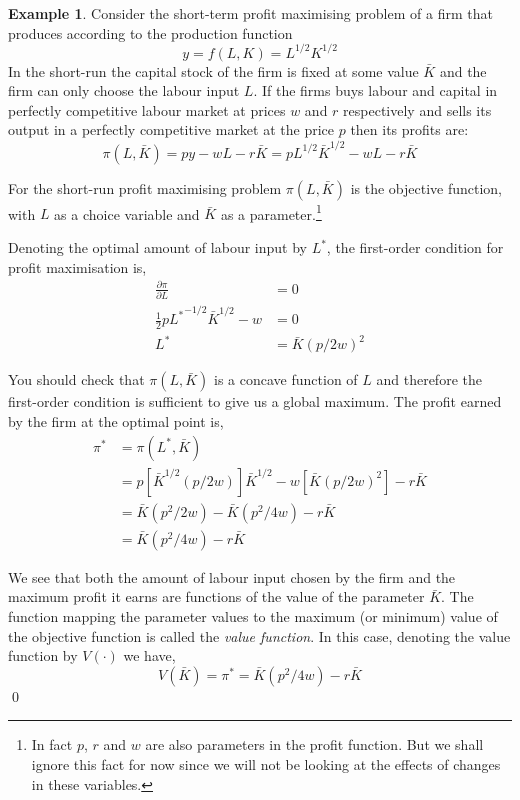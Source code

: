 \documentclass[12pt,reqno,openany]{amsbook}
\theoremstyle{plain}
\theoremstyle{definition}
\newtheorem{exmp}{Example}[chapter]
\begin{document}
\begin{exmp}\label{exmp:opti:profit}
Consider the short-term profit
maximising problem of a firm that produces according
to the production function
\[y=f(L,K)=L^{1/2}K^{1/2}\]
In the short-run the capital stock of the firm is fixed at some value
$\bar K$ and the firm can only choose the labour input $L$. If the
firms buys labour and capital in perfectly competitive labour market at prices
$w$ and $r$ respectively and sells its output in a perfectly competitive market at the
price $p$ then its profits are:
\[\pi(L,\bar K)=py-wL-r\bar K=pL^{1/2}{\bar K}^{1/2}-wL-r\bar K\]

For the short-run profit maximising problem $\pi(L,\bar K)$ is the
objective function, with $L$ as a choice variable and $\bar K$ as a
parameter.\footnote{In fact $p$, $r$ and $w$ are also parameters in
  the profit function. But we shall ignore this fact for now since we
  will not be looking at the effects of changes in these variables.}

Denoting the optimal amount of labour input by $L^*$, the first-order condition for profit maximisation is,
\begin{align*}
\frac{\partial \pi}{\partial L}&=0\\
\frac{1}{2}p{L^*}^{-1/2}{\bar K}^{1/2}-w&=0\\
L^*&={\bar K}(p/2w)^2
\end{align*}

You should check that $\pi(L,\bar K)$ is a concave function of $L$ and
therefore the first-order condition is sufficient to give us a global
maximum. The profit earned by the firm at the optimal point is,
\begin{align*}
\pi^*&=\pi(L^*,\bar K)\\
&=p[{\bar K}^{1/2}(p/2w)]{\bar K}^{1/2}-w[{\bar K}(p/2w)^2]-r\bar K\\
&={\bar K}(p^2/2w)-{\bar K}(p^2/4w)-r\bar K\\
&={\bar K}(p^2/4w)-r\bar K
\end{align*}

We see that both the amount of labour input chosen by the firm and the
maximum profit it earns are functions of the value of the parameter
$\bar K$. The function mapping the parameter values to the maximum (or
minimum) value of the objective function is called the \emph{value
  function}. In this case, denoting the value function by $V(\cdot)$
we have,
\[V(\bar K)=\pi^*={\bar K}(p^2/4w)-r\bar K\]
\qed
\end{exmp}
\end{document}

